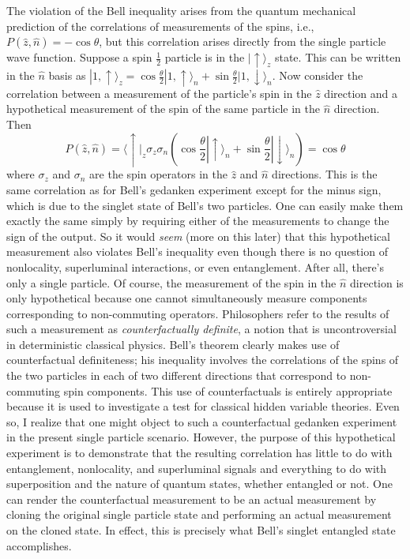 \documentclass[12pt]{article}
\begin{document}
The violation of the Bell inequality arises from the quantum mechanical prediction of the correlations of measurements of the spins, i.e., $P(\hat{z},\hat{n})=-\cos \theta$, but this correlation arises directly from the single particle wave function.  Suppose a spin $\frac{1}{2}$ particle is in the $|\uparrow\rangle_z$ state.  This can be written in the $\hat{n}$ basis as $|1,\uparrow \rangle_z = \cos{\frac{\theta}{2}} |1,\uparrow \rangle_n + \sin{\frac{\theta}{2}} |1,\downarrow \rangle_n$.  Now consider the correlation between a measurement of the particle's spin in the $\hat{z}$ direction and a hypothetical measurement of the spin of the same particle in the $\hat{n}$ direction.  Then
\begin{equation}
P(\hat{z},\hat{n}) = \langle \uparrow|_z \sigma_z \sigma_n (\cos{\frac{\theta}{2}} |\uparrow \rangle_n + \sin{\frac{\theta}{2}}|\downarrow \rangle_n)=\cos\theta
\end{equation}
where $\sigma_{z}$ and $\sigma_{n}$ are the spin operators in the $\hat{z}$ and  $\hat{n}$ directions. 
This is the same correlation as for Bell's gedanken experiment except for the minus sign, which is due to the singlet state of Bell's two particles.  One can easily make them exactly the same simply by requiring either of the measurements to change the sign of the output.  So it would {\it seem} (more on this later) that this hypothetical measurement also violates Bell's inequality even though there is no question of nonlocality, superluminal interactions, or even entanglement.  After all, there's only a single particle.  Of course, the measurement of the spin in the $\hat{n}$ direction is only hypothetical because one cannot simultaneously measure components corresponding to non-commuting operators.  Philosophers refer to the results of such a measurement as {\it counterfactually definite}, a notion that is uncontroversial in deterministic classical physics.  Bell's theorem clearly makes use of counterfactual definiteness; his inequality involves the correlations of the spins of the two particles in each of two different directions that correspond to non-commuting spin components. This use of counterfactuals is entirely appropriate because it is used to investigate a test for classical hidden variable theories.    Even so, I realize that one might object to such a counterfactual gedanken experiment in the present single particle scenario. However, the purpose of this hypothetical experiment is to demonstrate that the resulting correlation has little to do with entanglement, nonlocality, and superluminal signals and everything to do with superposition and the nature of quantum states, whether entangled or not.  One can render the counterfactual measurement to be an actual measurement by cloning the original single particle state and performing an actual measurement on the cloned state.  In effect, this is precisely what Bell's singlet entangled state accomplishes.
\end{document}
